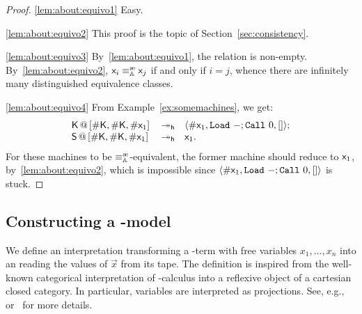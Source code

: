 \begin{proof}
\ref{lem:about:equivo1} %
	Easy.

\ref{lem:about:equivo2} %
	This proof is the topic of Section~\ref{sec:consistency}.

\ref{lem:about:equivo3} %
By~\ref{lem:about:equivo1}, the relation is non-empty. By~\ref{lem:about:equivo2}, $\mach{x}_i \equivea \mach{x}_j $ if and only if $ i = j$, whence there are infinitely many distinguished equivalence classes.

\ref{lem:about:equivo4} %
From Example~\ref{ex:somemachines}, we get:
\[
	\begin{array}{lcl}
	\mathsf{K}\,@\,{[}\#\mathsf{K},\#\mathsf{K},\#\mathsf{x}_1{]}\,&\twoheadrightarrow_{\mathsf{h}}&\langle \#{\mathsf{x}_1,\mathtt{Load}~-;\mathtt{Call}~0,[]}\rangle;\\
	\mathsf{S}\,@\,{[}\#\mathsf{K},\#\mathsf{K},\#\mathsf{x}_1{]}\,&\twoheadrightarrow_{\mathsf{h}}&\mathsf{x}_1.\\
	\end{array}
\]
For these machines to be $\equivea$-equivalent, the former machine should reduce to $\mathsf{x}_1$, by~\ref{lem:about:equivo2}, which is impossible since $\langle \#{\mathsf{x}_1,\mathtt{Load}~-;\mathtt{Call}~0,[]}\rangle$ is stuck.
\end{proof}

\subsection{Constructing a \lam-model}

We define an interpretation transforming a \lam-term with free variables $x_1,\dots,x_n$ into an \am{} reading the values of $\vec x$ from its tape.
The definition is inspired from the well-known categorical interpretation of \lam-calculus into a reflexive object of a cartesian closed category.
In particular, variables are interpreted as projections.
See, e.g.,~\cite{Koymans82} or~\cite{Selinger02} for more details.


